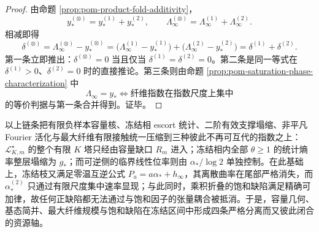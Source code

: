 \begin{proof}
由命题 \ref{prop:pom-product-fold-additivity}，
\[
y_\ast^{(\otimes)}=y_\ast^{(1)}+y_\ast^{(2)},
\qquad
\Lambda_\infty^{(\otimes)}=\Lambda_\infty^{(1)}+\Lambda_\infty^{(2)}.
\]
相减即得
\[
\delta^{(\otimes)}
=
\Lambda_\infty^{(\otimes)}-y_\ast^{(\otimes)}
=
\bigl(\Lambda_\infty^{(1)}-y_\ast^{(1)}\bigr)
+\bigl(\Lambda_\infty^{(2)}-y_\ast^{(2)}\bigr)
=
\delta^{(1)}+\delta^{(2)}.
\]
第一条立即推出：\(\delta^{(\otimes)}=0\) 当且仅当 \(\delta^{(1)}=\delta^{(2)}=0\)。第二条是同一等式在 \(\delta^{(1)}>0\)、\(\delta^{(2)}=0\) 时的直接推论。第三条则由命题 \ref{prop:pom-saturation-phase-characterization} 中
\[
\Lambda_\infty=y_\ast
\iff
\text{纤维指数在指数尺度上集中}
\]
的等价判据与第一条合并得到。证毕。
\end{proof}

\noindent
以上链条把有限负样本容量核、冻结相 escort 统计、二阶有效支撑塌缩、非平凡 Fourier 活化与最大纤维有限接触统一压缩到三种彼此不再可互代的指数之上：\(\mathcal L_{K,m}^\star\) 的整个有限 \(K\) 塔只经由容量缺口 \(R_m\) 进入；冻结相内全部 \(\theta\ge 1\) 的统计熵率整层塌缩为 \(g_\ast\)；而可逆侧的临界线性位率则由 \(\alpha_\ast/\log 2\) 单独控制。在此基础上，冻结枝又满足零温互逆公式 \(P_a=a\alpha_\ast+h_\infty\)，其离散曲率在尾部严格消失，而 \(\alpha_\ast^{(2)}\) 只通过有限尺度集中速率显现；与此同时，乘积折叠的饱和缺陷满足精确可加律，故任何正缺陷都无法通过与饱和因子的张量耦合被抵消。于是，容量几何、基态简并、最大纤维规模与饱和缺陷在冻结区间中形成四条严格分离而又彼此闭合的资源轴。

\endinput
